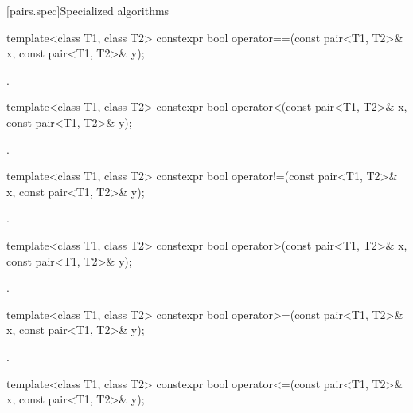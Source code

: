 [pairs.spec]{Specialized algorithms}

%
\begin{itemdecl}
template<class T1, class T2>
  constexpr bool operator==(const pair<T1, T2>& x, const pair<T1, T2>& y);
\end{itemdecl}

\begin{itemdescr}
\pnum
\returns
{}.
\end{itemdescr}

%
\begin{itemdecl}
template<class T1, class T2>
  constexpr bool operator<(const pair<T1, T2>& x, const pair<T1, T2>& y);
\end{itemdecl}

\begin{itemdescr}
\pnum
\returns
{}.
\end{itemdescr}

%
\begin{itemdecl}
template<class T1, class T2>
  constexpr bool operator!=(const pair<T1, T2>& x, const pair<T1, T2>& y);
\end{itemdecl}

\begin{itemdescr}
\pnum
\returns {}.
\end{itemdescr}

%
\begin{itemdecl}
template<class T1, class T2>
  constexpr bool operator>(const pair<T1, T2>& x, const pair<T1, T2>& y);
\end{itemdecl}

\begin{itemdescr}
\pnum
\returns {}.
\end{itemdescr}

%
\begin{itemdecl}
template<class T1, class T2>
  constexpr bool operator>=(const pair<T1, T2>& x, const pair<T1, T2>& y);
\end{itemdecl}

\begin{itemdescr}
\pnum
\returns {}.
\end{itemdescr}

%
\begin{itemdecl}
template<class T1, class T2>
  constexpr bool operator<=(const pair<T1, T2>& x, const pair<T1, T2>& y);
\end{itemdecl}


